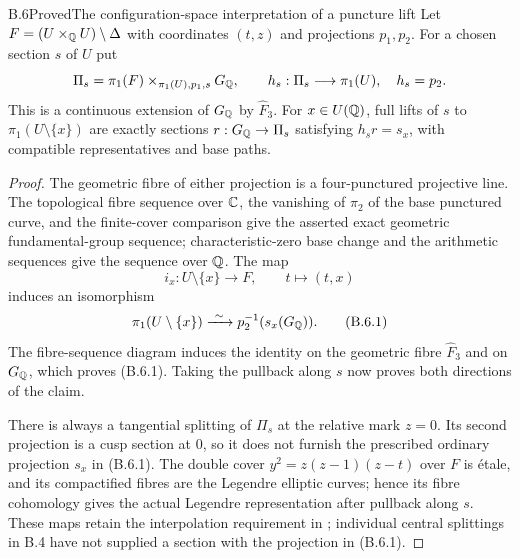 \begin{statement}{B.6}{Proved}{The configuration-space interpretation of a puncture lift}
Let $F=(U\times_\mathbb Q U)\setminus\Delta$ with coordinates $(t,z)$ and
projections $p_1,p_2$.  For a chosen section $s$ of $U$ put
\[
 \Pi_s=\pi_1(F)\times_{\pi_1(U),p_1,s}G_\mathbb Q,
 \qquad h_s:\Pi_s\longrightarrow\pi_1(U),\quad h_s=p_2.
\]
This is a continuous extension of $G_\mathbb Q$ by $\widehat F_3$.
For $x\in U(\mathbb Q)$, full lifts of $s$ to $\pi_1(U\setminus\{x\})$
are exactly sections $r:G_\mathbb Q\to\Pi_s$ satisfying
$h_sr=s_x$, with compatible representatives and base paths.
\end{statement}
\begin{proof}
The geometric fibre of either projection is a four-punctured projective
line.  The topological fibre sequence over $\mathbb C$, the vanishing of
$\pi_2$ of the base punctured curve, and the finite-cover comparison
give the asserted exact geometric fundamental-group sequence;
characteristic-zero base change and the arithmetic sequences give
the sequence over $\mathbb Q$.  The map
\[
 i_x:U\setminus\{x\}\longrightarrow F,\qquad t\longmapsto(t,x)
\]
induces an isomorphism
\[
 \pi_1(U\setminus\{x\})
 \xrightarrow{\ \sim\ }p_2^{-1}(s_x(G_\mathbb Q)).       \tag{B.6.1}
\]
The fibre-sequence diagram induces the identity on the geometric
fibre $\widehat F_3$ and on $G_\mathbb Q$, which proves (B.6.1).
Taking the pullback along $s$ now proves both directions of the claim.

There is always a tangential splitting of $\Pi_s$ at the relative
mark $z=0$.  Its second projection is a cusp section at $0$, so it
does not furnish the prescribed ordinary projection $s_x$ in
(B.6.1).  The double cover
$y^2=z(z-1)(z-t)$ over $F$ is \'etale, and its compactified fibres
are the Legendre elliptic curves; hence its fibre cohomology gives
the actual Legendre representation after pullback along $s$.
These maps retain the interpolation requirement in
\cite[Theorem C]{BIR_Bresciani2024}; individual central splittings
in B.4 have not supplied a section with the projection in (B.6.1).
\end{proof}

